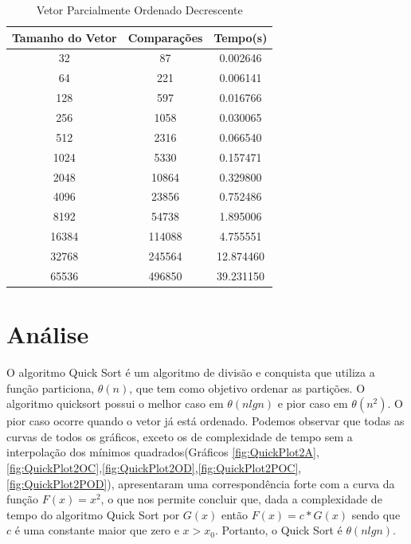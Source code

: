 \documentclass[12pt,a4paper,twoside]{report}
\begin{document}
\begin{table}[h]
  \centering
  \caption{Vetor Parcialmente Ordenado Decrescente \label{tab:pod}}
  \begin{tabular}{ccc} \\\hline
  \textbf{Tamanho do Vetor} & \textbf{Comparações} & \textbf{Tempo(s)} \\\hline
  32                        & 87                   & 0.002646          \\\hline
  64                        & 221                  & 0.006141          \\\hline
  128                       & 597                  & 0.016766          \\\hline
  256                       & 1058                 & 0.030065          \\\hline
  512                       & 2316                 & 0.066540          \\\hline
  1024                      & 5330                 & 0.157471          \\\hline
  2048                      & 10864                & 0.329800          \\\hline
  4096                      & 23856                & 0.752486         \\\hline
  8192                      & 54738                & 1.895006        \\\hline
  16384                     & 114088               & 4.755551        \\\hline
  32768                     & 245564               & 12.874460        \\\hline
  65536                     & 496850               & 39.231150        \\\hline
  \end{tabular}
\end{table}


\chapter{Análise}

O algoritmo Quick Sort é um algoritmo de divisão e conquista que utiliza a função particiona, $\theta(n)$, que tem como objetivo ordenar as partições. O algoritmo quicksort possui o melhor caso em $\theta(nlgn)$ e pior caso em $\theta(n^2)$. O pior caso ocorre quando o vetor já está ordenado.
Podemos observar que todas as curvas de todos os gráficos, exceto os de complexidade de tempo sem a interpolação dos mínimos quadrados(Gráficos \ref{fig:QuickPlot2A},\ref{fig:QuickPlot2OC},\ref{fig:QuickPlot2OD},\ref{fig:QuickPlot2POC},\ref{fig:QuickPlot2POD}), apresentaram uma correspondência forte com a curva da função $F(x) = x^2$, o que nos permite concluir que, dada a complexidade de tempo do algoritmo Quick Sort por $G(x)$ então $F(x) = c * G(x)$ sendo que $c$ é uma constante maior que zero e $x > x_0$. Portanto, o Quick Sort é $\theta(nlgn)$.
\end{document}
